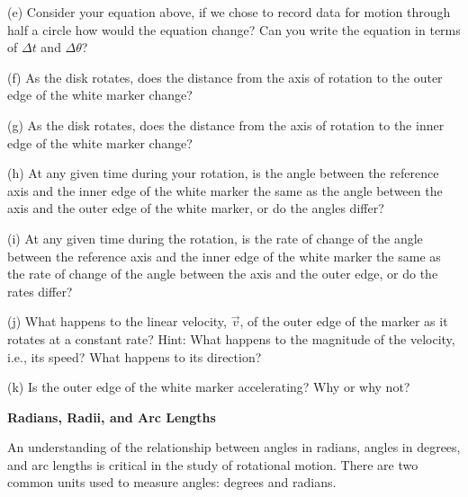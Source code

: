 \pagebreak[3]

(e) Consider your equation above, if we chose to record data for motion through half a circle how would the equation change?  Can you write the equation in terms of  $\Delta t$ and $\Delta  \theta$?  
\answerspace{10mm}

(f) As the disk rotates, does the distance from the axis of rotation to the outer edge of the white marker change?
\answerspace{10mm}

(g) As the disk rotates, does the distance from the axis of rotation to the inner edge of the white marker change?
\answerspace{10mm}

(h) At any given time during your rotation, is the angle between the reference
axis and the inner edge of the white marker the same as the angle between the
axis and the outer edge of the white marker, or do the angles differ?
\answerspace{10mm}

(i) At any given time during the rotation, is the rate of change of the angle
between the reference axis and the inner edge of the white marker the same as
the rate of change of the angle between the axis and the outer edge, or do the
rates differ?
\answerspace{10mm}

(j) What happens to the linear velocity, $\vec{v}$, of the outer edge of the
marker as it rotates at a constant rate? Hint: What happens to the magnitude
of the velocity, i.e., its speed? What happens to its direction?
\answerspace{20mm}

(k) Is the outer edge of the white marker accelerating? Why or why not?
\answerspace{20mm}

\textbf{Radians, Radii, and Arc Lengths} 

An understanding of the relationship between angles in radians, angles in degrees, and arc lengths is critical in the study of rotational motion. There are two
common units used to measure angles: degrees and radians.


